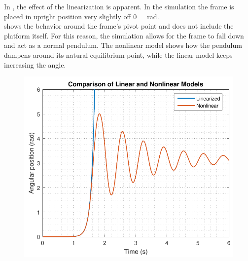 In , the effect of the linearization is apparent. In the simulation the frame is placed in upright position very slightly off \si{0\ rad}.\\
 shows the behavior around the frame's pivot point and does not include the platform itself. For this reason, the simulation allows for the frame to fall down and act as a normal pendulum. The nonlinear model shows how the pendulum dampens around its natural equilibrium point, while the linear model keeps increasing the angle.
%
\begin{figure}[H]
   \includegraphics[scale=.55]{figures/LinearizedVSNonlinear}
	\centering
	\captionsetup{justification=centering}
  	\label{LinearizedVSNonlinear}
\end{figure}


